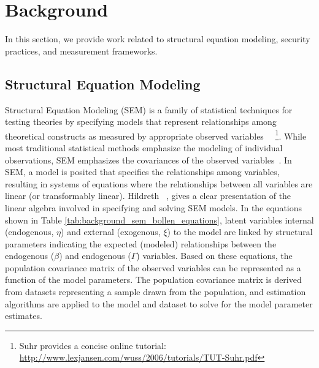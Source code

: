 \section{Background}
\label{sec:background}
In this section, we provide work related to structural equation modeling, security practices, and measurement frameworks.

\subsection{Structural Equation Modeling}

Structural Equation Modeling (SEM) is a family of statistical techniques for testing theories by specifying models that represent relationships among theoretical constructs as measured by appropriate observed variables~\cite{kline2015principles} ~\footnote{Suhr provides a concise online tutorial: \url{http://www.lexjansen.com/wuss/2006/tutorials/TUT-Suhr.pdf}}. While most traditional statistical methods emphasize the modeling of individual observations, SEM emphasizes the covariances of the observed variables~\cite{hildreth2013residual}. In SEM, a model is posited that specifies the relationships among variables, resulting in systems of equations where the relationships between all variables are linear (or transformably linear). Hildreth ~\cite{hildreth2013residual}, gives a clear presentation of the linear algebra involved in specifying and solving SEM models. In the equations shown in Table \ref{tab:background_sem_bollen_equations}, latent variables internal (endogenous, $\eta$) and external (exogenous, $\xi$) to the model are linked by structural parameters indicating the expected (modeled) relationships between the endogenous ($\beta$) and endogenous ($\Gamma$) variables. Based on these equations, the population covariance matrix of the observed variables can be represented as a function of the model parameters. The population covariance matrix is derived from datasets representing a sample drawn from the population, and estimation algorithms are applied to the model and dataset to solve for the model parameter estimates. 
